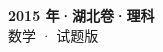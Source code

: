 \documentclass[zihao=-4, a4paper]{ctexart}
\begin{document}
\begin{center}
  {\Large\bfseries 2015 年·湖北卷·理科}\\[4pt]
  {\large 数学 · 试题版}
\end{center}
\medskip
{}

\end{document}

